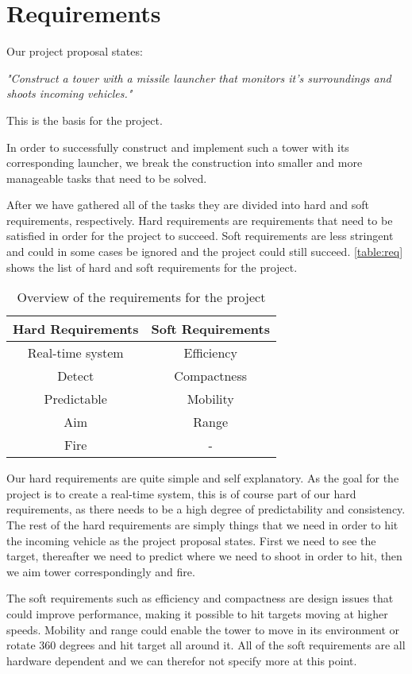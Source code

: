 \section{Requirements}
Our project proposal states: 

\emph{"Construct a tower with a missile launcher that monitors it's surroundings and shoots incoming vehicles."} 

This is the basis for the project.

In order to successfully construct and implement such a tower with its corresponding launcher, we break the construction into smaller and more manageable tasks that need to be solved.

After we have gathered all of the tasks they are divided into hard and soft requirements, respectively. Hard requirements are requirements that need to be satisfied in order for the project to succeed. Soft requirements are less stringent and could in some cases be ignored and the project could still succeed. \autoref{table:req} shows the list of hard and soft requirements for the project.

\begin{table}[hptb]
\centering
\begin{tabular}{ c c}
\textbf{Hard Requirements} & \textbf{Soft Requirements}\\ [0.5ex]
\hline
Real-time system	&   Efficiency\\
Detect				&	Compactness\\
Predictable			&	Mobility\\
Aim     			&   Range\\ 
Fire				&	-\\[1ex]
\hline
\end{tabular}
\caption{Overview of the requirements for the project}
\label{table:req}
\end{table}

Our hard requirements are quite simple and self explanatory. As the goal for the project is to create a real-time system, this is of course part of our hard requirements, as there needs to be a high degree of predictability and consistency. The rest of the hard requirements are simply things that we need in order to hit the incoming vehicle as the project proposal states. First we need to see the target, thereafter we need to predict where we need to shoot in order to hit, then we aim tower correspondingly and fire. 

The soft requirements such as efficiency and compactness are design issues that could improve performance, making it possible to hit targets moving at higher speeds. Mobility and range could enable the tower to move in its environment or rotate 360 degrees and hit target all around it. All of the soft requirements are all hardware dependent and we can therefor not specify more at this point.